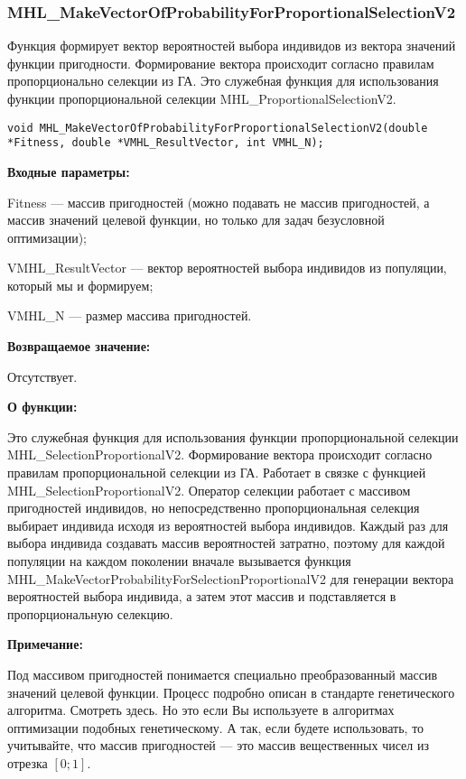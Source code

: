 \documentclass[a4paper,12pt]{article}
\begin{document}
\subsubsection{MHL\_MakeVectorOfProbabilityForProportionalSelectionV2}\label{MHL_MakeVectorOfProbabilityForProportionalSelectionV2}

Функция формирует вектор вероятностей выбора индивидов из вектора значений функции пригодности. Формирование вектора происходит согласно правилам пропорционально селекции из ГА. Это служебная функция для использования функции пропорциональной селекции MHL\_ProportionalSelectionV2.


\begin{lstlisting}[label=code_syntax_MHL_MakeVectorOfProbabilityForProportionalSelectionV2,caption=Синтаксис]
void MHL_MakeVectorOfProbabilityForProportionalSelectionV2(double *Fitness, double *VMHL_ResultVector, int VMHL_N);
\end{lstlisting}

\textbf{Входные параметры:}
 
Fitness --- массив пригодностей (можно подавать не массив пригодностей, а массив значений целевой функции, но только для задач безусловной оптимизации);
 
VMHL\_ResultVector --- вектор вероятностей выбора индивидов из популяции, который мы и формируем;
 
VMHL\_N --- размер массива пригодностей.

\textbf{Возвращаемое значение:} 

Отсутствует.

\textbf{О функции:}

 Это служебная функция для использования функции пропорциональной селекции MHL\_SelectionProportionalV2.
Формирование вектора происходит согласно правилам пропорциональной селекции из ГА.
Работает в связке с функцией MHL\_SelectionProportionalV2. Оператор селекции работает с массивом пригодностей индивидов, но непосредственно пропорциональная селекция выбирает индивида исходя из вероятностей выбора индивидов. Каждый раз для выбора индивида создавать массив вероятностей затратно, поэтому для каждой популяции на каждом поколении вначале вызывается функция MHL\_MakeVectorProbabilityForSelectionProportionalV2 для генерации вектора вероятностей выбора индивида, а затем этот массив и подставляется в пропорциональную селекцию.

\textbf{Примечание:}

 Под массивом пригодностей понимается специально преобразованный массив значений целевой функции. Процесс подробно описан в стандарте генетического алгоритма. Смотреть здесь. Но это если Вы используете в алгоритмах оптимизации подобных генетическому. А так, если будете использовать, то учитывайте, что массив пригодностей --- это массив вещественных чисел из отрезка $[0;1]$.
 
\end{document}
